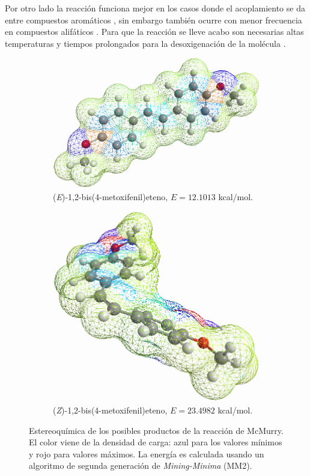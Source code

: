 \documentclass[fleqn,11pt]{SelfArx}
\begin{document}
Por otro lado la reacci\'on funciona mejor en los casos donde el acoplamiento se da entre compuestos arom\'aticos \cite{Wang2010}, sin embargo tambi\'en ocurre con menor frecuencia en compuestos alif\'aticos \cite{Rele2001}. Para que la reacci\'on se lleve acabo son necesarias altas temperaturas y tiempos prolongados para la desoxigenaci\'on de la mol\'ecula \cite{Wang2010, Villiers1997}.
\begin{figure}[ht]
	\centering
	\begin{subfigure}[t]{0.49\linewidth}
		\centering
		\includegraphics[width=0.9\linewidth]{structures/productE.png}
		\caption{(\textit{E})-1,2-bis(4-metoxifenil)eteno, $E=12.1013$ kcal/mol.}
	\end{subfigure}
	\begin{subfigure}[t]{0.49\linewidth}
		\centering
		\includegraphics[width=0.7\linewidth]{structures/productZ.png}
		\caption{(\textit{Z})-1,2-bis(4-metoxifenil)eteno, $E=23.4982$ kcal/mol.}
	\end{subfigure}
	\caption{Estereoqu\'imica de los posibles productos de la reacci\'on de McMurry. El color viene de la densidad de carga: azul para los valores m\'inimos y rojo para valores m\'aximos. La energ\'ia es calculada usando un algoritmo de segunda generaci\'on de \textit{Mining-Minima} (MM2)\cite{Huang2012}.}
	\label{fig: both}
\end{figure}
\end{document}
